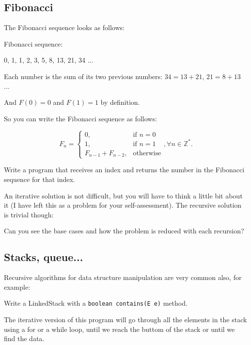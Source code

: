 \documentclass[a4paper, 9pt]{extarticle}
\begin{document}
\subsection{Fibonacci}

The Fibonacci sequence looks as follows:

\begin{blackboard}
Fibonacci sequence:

  0, 1, 1, 2, 3, 5, 8, 13, 21, 34 ...
\end{blackboard}

Each number is the sum of its two previous numbers: $34 = 13 + 21$, $21 = 8 + 13$ ...

And $F(0) = 0$ and $F(1) = 1$ by definition.

So you can write the Fibonacci sequence as follows:

\begin{equation*}
  F_n =
  \begin{cases}
    0, & \text{if } n = 0\\
    1, & \text{if } n = 1\\
    F_{n-1} + F_{n-2}, & \text{otherwise}
  \end{cases}, \forall n \in \mathbb{Z}^{*}.
\end{equation*}

Write a program that receives an index and returns the number in the Fibonacci
sequence for that index.

An iterative solution is not difficult, but you will have to think a little bit
about it (I have left this as a problem for your self-assessment). The
recursive solution is trivial though:


Can you see the base cases and how the problem is reduced with each recursion?

\subsection{Stacks, queue...}

Recursive algorithms for data structure manipulation are very common also, for
example:

Write a LinkedStack with a \texttt{boolean contains(E e)} method.

The iterative version of this program will go through all the elements in the
stack using a for or a while loop, until we reach the buttom of the stack or
until we find the data.
\end{document}

